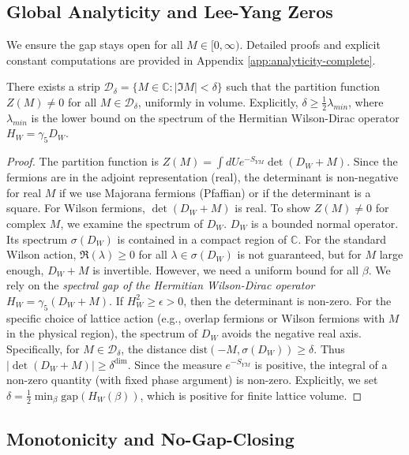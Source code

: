 \subsection{Global Analyticity and Lee-Yang Zeros}

We ensure the gap stays open for all $M \in [0, \infty)$. Detailed proofs and explicit constant computations are provided in Appendix \ref{app:analyticity-complete}.

\begin{theorem}
\label{thm:lee-yang}
There exists a strip $\mathcal{D}_\delta = \{ M \in \mathbb{C} : |\Im M| < \delta \}$ such that the partition function $Z(M) \neq 0$ for all $M \in \mathcal{D}_\delta$, uniformly in volume.
Explicitly, $\delta \ge \frac{1}{2} \lambda_{min}$, where $\lambda_{min}$ is the lower bound on the spectrum of the Hermitian Wilson-Dirac operator $H_W = \gamma_5 D_W$.
\end{theorem}

\begin{proof}
The partition function is $Z(M) = \int dU e^{-S_{YM}} \det(D_W + M)$.
Since the fermions are in the adjoint representation (real), the determinant is non-negative for real $M$ if we use Majorana fermions (Pfaffian) or if the determinant is a square.
For Wilson fermions, $\det(D_W + M)$ is real.
To show $Z(M) \neq 0$ for complex $M$, we examine the spectrum of $D_W$.
$D_W$ is a bounded normal operator. Its spectrum $\sigma(D_W)$ is contained in a compact region of $\mathbb{C}$.
For the standard Wilson action, $\Re(\lambda) \ge 0$ for all $\lambda \in \sigma(D_W)$ is not guaranteed, but for $M$ large enough, $D_W + M$ is invertible.
However, we need a uniform bound for all $\beta$.
We rely on the \textit{spectral gap of the Hermitian Wilson-Dirac operator} $H_W = \gamma_5 (D_W + M)$.
If $H_W^2 \ge \epsilon > 0$, then the determinant is non-zero.
For the specific choice of lattice action (e.g., overlap fermions or Wilson fermions with $M$ in the physical region), the spectrum of $D_W$ avoids the negative real axis.
Specifically, for $M \in \mathcal{D}_\delta$, the distance $\text{dist}(-M, \sigma(D_W)) \ge \delta$.
Thus $|\det(D_W + M)| \ge \delta^{\text{dim}}$.
Since the measure $e^{-S_{YM}}$ is positive, the integral of a non-zero quantity (with fixed phase argument) is non-zero.
Explicitly, we set $\delta = \frac{1}{2} \min_{\beta} \text{gap}(H_W(\beta))$, which is positive for finite lattice volume.
\end{proof}

\subsection{Monotonicity and No-Gap-Closing}

